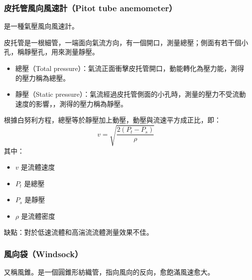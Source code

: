 \documentclass[a4paper,12pt]{report}
\begin{document}
\begin{itemize}
\subsubsection{皮托管風向風速計（Pitot tube anemometer）}
是一種氣壓風向風速計。

皮托管是一根細管，一端面向氣流方向，有一個開口，測量總壓；側面有若干個小孔，稱靜壓孔，用來測量靜壓。
\begin{itemize}
\item 總壓（Total pressure）：氣流正面衝擊皮托管開口，動能轉化為壓力能，測得的壓力稱為總壓。
\item 靜壓（Static pressure）：氣流經過皮托管側面的小孔時，測量的壓力不受流動速度的影響，，測得的壓力稱為靜壓。
\end{itemize}
根據白努利方程，總壓等於靜壓加上動壓，動壓與流速平方成正比，即：
\[ v = \sqrt{\frac{2(P_t - P_s)}{\rho}} \]
其中：
\begin{itemize}
\item \( v \) 是流體速度
\item \( P_t \) 是總壓
\item \( P_s \) 是靜壓
\item \( \rho \) 是流體密度
\end{itemize}
缺點：對於低速流體和高湍流流體測量效果不佳。
\subsubsection{風向袋（Windsock）}
又稱風錐。是一個圓錐形紡織管，指向風向的反向，愈飽滿風速愈大。

\end{itemize}
\end{document}
